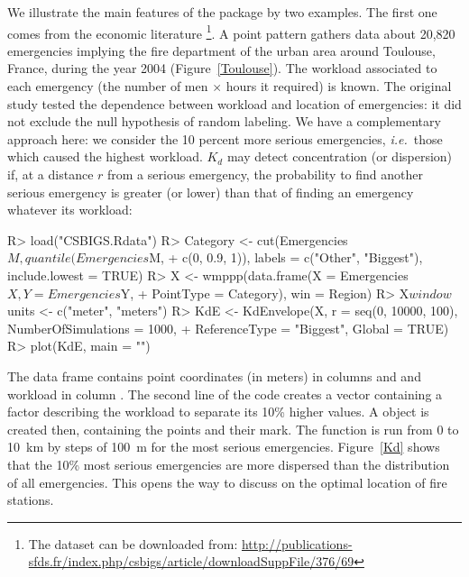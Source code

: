 \documentclass[nojss]{jss}
\begin{document}
We illustrate the main features of the package by two examples. The first one comes from the economic literature \citep{Bonneu2007}\footnote{The dataset can be downloaded from: 
 \url {http://publications-sfds.fr/index.php/csbigs/article/downloadSuppFile/376/69}}. A point pattern gathers data about 20,820 emergencies implying the fire department of the urban area around Toulouse, France, during the year 2004 (Figure~\ref{Toulouse}). The workload associated to each emergency (the number of men $\times$ hours it required) is known. The original study tested the dependence between workload and location of emergencies: it did not exclude the null hypothesis of random labeling. We have a complementary approach here: we consider the 10 percent more serious emergencies, \emph{i.e.}\ those which caused the highest workload. $K_d$ may detect concentration (or dispersion) if, at a distance $r$ from a serious emergency, the probability to find another serious emergency is greater (or lower) than that of finding an emergency whatever its workload:

\begin{Schunk}
\begin{Sinput}
R> load("CSBIGS.Rdata")
R> Category <- cut(Emergencies$M, quantile(Emergencies$M, 
+      c(0, 0.9, 1)), labels = c("Other", "Biggest"), include.lowest = TRUE)
R> X <- wmppp(data.frame(X = Emergencies$X, Y = Emergencies$Y, 
+      PointType = Category), win = Region)
R> X$window$units <- c("meter", "meters")
R> KdE <- KdEnvelope(X, r = seq(0, 10000, 100), NumberOfSimulations = 1000, 
+      ReferenceType = "Biggest", Global = TRUE)
R> plot(KdE, main = "")
\end{Sinput}
\end{Schunk}

The  data frame contains point coordinates (in meters) in columns  and  and workload in column . The second line of the code creates a vector containing a factor describing the workload to separate its 10\% higher values. A  object is created then, containing the points and their mark. The  function is run from 0 to 10~km by steps of 100~m for the most serious emergencies. Figure~\ref{Kd} shows that the 10\% most serious emergencies are more dispersed than the distribution of all emergencies. This opens the way to discuss on the optimal location of fire stations.
\end{document}
